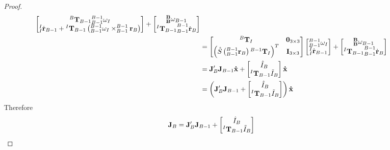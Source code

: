 \begin{lemma}
\begin{proof}
\begin{align*}
\begin{bmatrix}
			{{{^B}\mathbf{T}_{B-1}}{^{B - 1}_{B - 1}\omega_{I}}} \\
			{^{I}_{I}\dot{\mathbf{r}}_{B - 1} + {^I\mathbf{T}_{B - 1} \left ( ^{B-1}_{B-1}\omega_I \times ^{B-1}_{B-1}\mathbf{r}_B \right )}}
			\end{bmatrix} + \begin{bmatrix}
			{^\mathbf{B}_\mathbf{B}\omega_{B - 1}} \\
			{{^I\mathbf{T}_{B-1}}^{B - 1}_{B - 1}\dot{\mathbf{r}}_B}
			\end{bmatrix} \\
			                                                     & =                  
			\begin{bmatrix}
			{^B\mathbf{T}_I}                                             & {\mathbf{0}}_{3 \times 3} \\
			\left (\mathring{S}\left(^{B-1}_{B-1}\mathbf{r}_B\right){^{B-1}\mathbf{T}_{I}} \right )^T & {\mathbf{I}}_{3 \times 3}  
			\end{bmatrix}
			\begin{bmatrix}
			{^{B - 1}_{B - 1}\omega_{I}} \\
			{^{I}_{I}\dot{\mathbf{r}}_{B - 1}}
			\end{bmatrix} + \begin{bmatrix}
			{^\mathbf{B}_\mathbf{B}\omega_{B - 1}} \\
			{{^I\mathbf{T}_{B-1}}^{B - 1}_{B - 1}\dot{\mathbf{r}}_B}
			\end{bmatrix} \\
			                                                     & =                  
			\mathbf{J}_B'\mathbf{J}_{B-1}{\mathbf{\dot{x}}} + \begin{bmatrix}
			{\hat{I}_B} \\
			{{^I\mathbf{T}_{B-1}}\Tilde{I}_B}
			\end{bmatrix} {\mathbf{\dot{x}}} \\
			                                                     & =                  
			\left ( \mathbf{J}_B'\mathbf{J}_{B-1} + \begin{bmatrix}
			{\hat{I}_B} \\
			{{^I\mathbf{T}_{B-1}}\Tilde{I}_B}
			\end{bmatrix} \right) {\mathbf{\dot{x}}} 
		\end{align*}
		\noindent Therefore
		\begin{align} \label{eqn:recurse_jacob}
			\mathbf{J}_B & = \mathbf{J}_B' \mathbf{J}_{B-1} + \begin{bmatrix} 
			{\hat{I}_B} \\
			{{^I\mathbf{T}_{B-1}}\Tilde{I}_B} \\
			\end{bmatrix}  
		\end{align}
	\end{proof}
\end{lemma}
